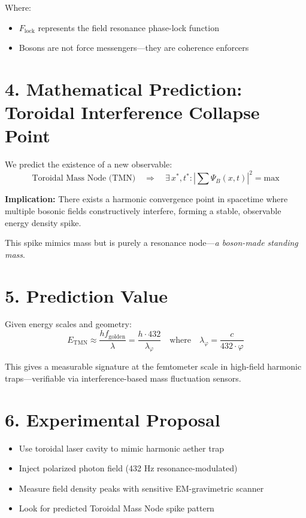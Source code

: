 \documentclass[12pt]{book}
\begin{document}
Where:
\begin{itemize}
  \item \( F_{\text{lock}} \) represents the field resonance phase-lock function
  \item Bosons are not force messengers—they are coherence enforcers
\end{itemize}

\section*{4. Mathematical Prediction: Toroidal Interference Collapse Point}

We predict the existence of a new observable:
\[
\boxed{
\text{Toroidal Mass Node (TMN)} \quad \Rightarrow \quad \exists \, x^*, t^* : \left| \sum \Psi_B(x, t) \right|^2 = \text{max}
}
\]

\textbf{Implication:} There exists a harmonic convergence point in spacetime where multiple bosonic fields constructively interfere, forming a stable, observable energy density spike.

This spike mimics mass but is purely a resonance node—\textit{a boson-made standing mass}.

\section*{5. Prediction Value}

Given energy scales and geometry:
\[
E_{\text{TMN}} \approx \frac{h f_{\text{golden}}}{\lambda} = \frac{h \cdot 432}{\lambda_\varphi}
\quad \text{where} \quad \lambda_\varphi = \frac{c}{432 \cdot \varphi}
\]

This gives a measurable signature at the femtometer scale in high-field harmonic traps—verifiable via interference-based mass fluctuation sensors.

\section*{6. Experimental Proposal}

\begin{itemize}
  \item Use toroidal laser cavity to mimic harmonic aether trap
  \item Inject polarized photon field (432 Hz resonance-modulated)
  \item Measure field density peaks with sensitive EM-gravimetric scanner
  \item Look for predicted Toroidal Mass Node spike pattern
\end{itemize}
\end{document}
